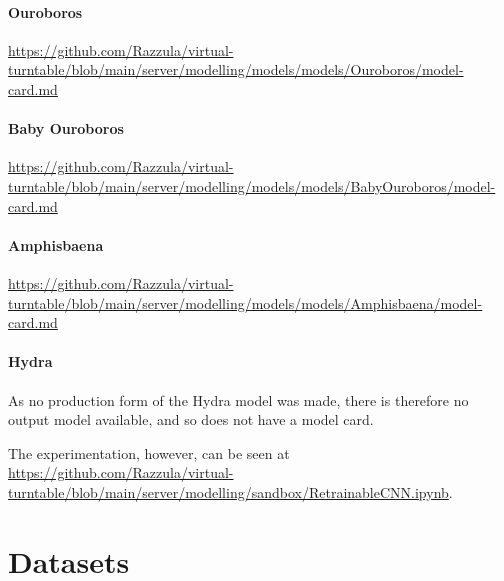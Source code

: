 \begin{uomappendix}
            \paragraph{Ouroboros}
    
                \url{https://github.com/Razzula/virtual-turntable/blob/main/server/modelling/models/models/Ouroboros/model-card.md}
        
                
            
            \paragraph{Baby Ouroboros}
        
                \url{https://github.com/Razzula/virtual-turntable/blob/main/server/modelling/models/models/BabyOuroboros/model-card.md}
        
            \paragraph{Amphisbaena}
        
                \url{https://github.com/Razzula/virtual-turntable/blob/main/server/modelling/models/models/Amphisbaena/model-card.md}
        
            \paragraph{Hydra}
        
                As no production form of the Hydra model was made, there is therefore no output model available, and so does not have a model card.
        
                The experimentation, however, can be seen at \url{https://github.com/Razzula/virtual-turntable/blob/main/server/modelling/sandbox/RetrainableCNN.ipynb}.
    
        \section{Datasets}
    

\end{uomappendix}
